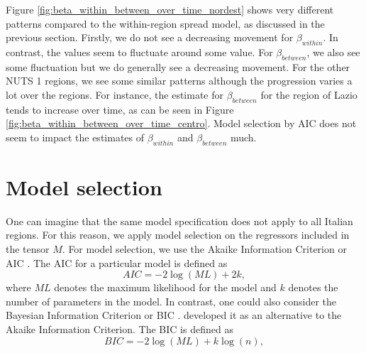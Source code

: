 \documentclass[12pt]{article}
\begin{document}
	Figure \ref{fig:beta_within_between_over_time_nordest} shows very different patterns compared to the within-region spread model, as discussed in the previous section. Firstly, we do not see a decreasing movement for $\beta_{within}$. In contrast, the values seem to fluctuate around some value. For $\beta_{between}$, we also see some fluctuation but we do generally see a decreasing movement. For the other NUTS 1 regions, we see some similar patterns although the progression varies a lot over the regions. For instance, the estimate for $\beta_{between}$ for the region of Lazio tends to increase over time, as can be seen in Figure \ref{fig:beta_within_between_over_time_centro}. Model selection by AIC does not seem to impact the estimates of $\beta_{within}$ and $\beta_{between}$ much.
	
	\section{Model selection} \label{sec:model_selection}
	One can imagine that the same model specification does not apply to all Italian regions. For this reason, we apply model selection on the regressors included in the tensor $M$. For model selection, we use the Akaike Information Criterion or AIC \parencite{akaike1974new}. The AIC for a particular model is defined as
	\begin{equation} \label{eq:AIC}
    	AIC = -2\log(ML) + 2k,    
	\end{equation}
	where $ML$ denotes the maximum likelihood for the model and $k$ denotes the number of parameters in the model. In contrast, one could also consider the Bayesian Information Criterion or BIC \parencite{schwarz1978estimating}. \textcite{schwarz1978estimating} developed it as an alternative to the Akaike Information Criterion. The BIC is defined as
	\begin{equation} \label{eq:BIC}
    	BIC = -2\log(ML) + k\log(n),
	\end{equation}
\end{document}
